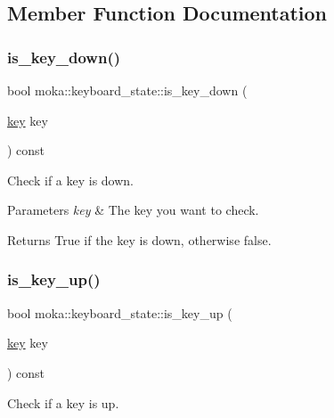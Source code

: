 \subsection{Member Function Documentation}
\mbox{\label{classmoka_1_1keyboard__state_a00bbf0b16f7e0f06e0f3699f8a5f88d2}} 
\subsubsection{\texorpdfstring{is\_key\_down()}{is\_key\_down()}}
{\footnotesize\ttfamily bool moka\+::keyboard\+\_\+state\+::is\+\_\+key\+\_\+down (\begin{DoxyParamCaption}\item[{\mbox{\hyperlink{namespacemoka_a45a36b05a9b9eddb028d6c60305ae71d}{key}}}]{key }\end{DoxyParamCaption}) const}



Check if a key is down. 


\begin{DoxyParams}{Parameters}
{\em key} & The key you want to check. \\
\hline
\end{DoxyParams}
\begin{DoxyReturn}{Returns}
True if the key is down, otherwise false. 
\end{DoxyReturn}
\mbox{\label{classmoka_1_1keyboard__state_afb05ac80eaa7fde852f03e260e82f94a}} 
\subsubsection{\texorpdfstring{is\_key\_up()}{is\_key\_up()}}
{\footnotesize\ttfamily bool moka\+::keyboard\+\_\+state\+::is\+\_\+key\+\_\+up (\begin{DoxyParamCaption}\item[{\mbox{\hyperlink{namespacemoka_a45a36b05a9b9eddb028d6c60305ae71d}{key}}}]{key }\end{DoxyParamCaption}) const}



Check if a key is up. 


